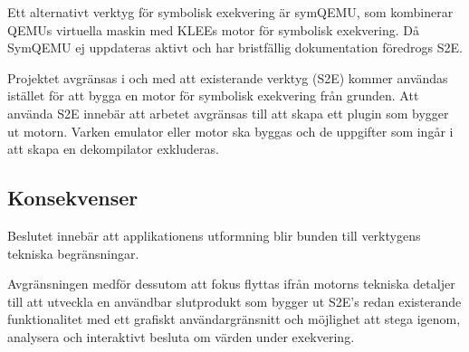 Ett alternativt verktyg för symbolisk exekvering är symQEMU, som kombinerar
QEMUs virtuella maskin med KLEEs motor för symbolisk exekvering. Då SymQEMU
ej uppdateras aktivt och har bristfällig dokumentation föredrogs S2E.

Projektet avgränsas i och med att existerande verktyg (S2E) kommer användas
istället för att bygga en motor för symbolisk exekvering från grunden. Att
använda S2E innebär att arbetet avgränsas till att skapa ett plugin som bygger
ut motorn. Varken emulator eller motor ska byggas och de uppgifter som ingår i
att skapa en dekompilator exkluderas.

\subsection{Konsekvenser}

Beslutet innebär att applikationens utformning blir bunden till verktygens
tekniska begränsningar.

Avgränsningen medför dessutom att fokus flyttas ifrån motorns tekniska detaljer
till att utveckla en användbar slutprodukt som bygger ut S2E's redan
existerande funktionalitet med ett grafiskt användargränsnitt och möjlighet att
stega igenom, analysera och interaktivt besluta om värden under exekvering.
